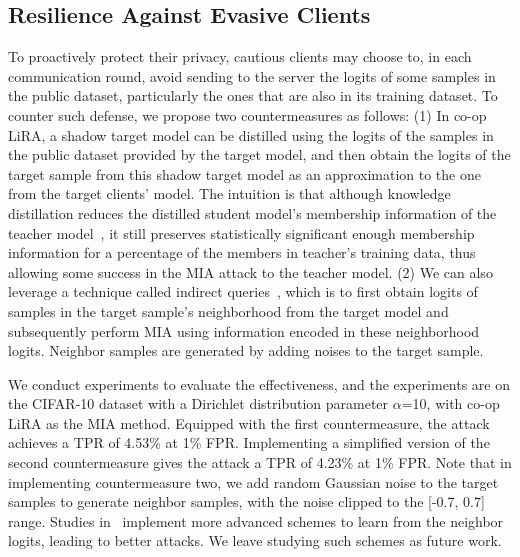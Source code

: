 \subsection{Resilience Against Evasive Clients}
To proactively protect their privacy,  cautious clients may choose to, in each communication round, avoid sending to the server the logits of some samples in the public dataset, particularly the ones that are also in its training dataset. 
To counter such defense, we propose two countermeasures as follows:
(1) In co-op LiRA, a shadow target model can be distilled using the logits of the samples in the public dataset provided by the target model, and then obtain the logits of the target sample from this shadow target model as an approximation to the one from the target clients' model. 
The intuition is that although knowledge distillation reduces the distilled student model's membership information of the teacher model~\cite{jagielski2024students}, it still preserves statistically significant enough membership information for a percentage of the members in teacher's training data, thus allowing some success in the MIA attack to the teacher model.
(2) We can also leverage a technique called indirect queries~\cite{wen2022canary, long2020pragmatic}, which is to first obtain logits of samples in the target sample's neighborhood from the target model and subsequently perform MIA using information encoded in these neighborhood logits. Neighbor samples are generated by adding noises to the target sample.

We conduct experiments to evaluate the effectiveness, and the experiments are on the CIFAR-10 dataset with a Dirichlet distribution parameter $\alpha$=10, with co-op LiRA as the MIA method.
Equipped with the first countermeasure, the attack achieves a TPR of 4.53\% at 1\% FPR.
Implementing a simplified version of the second countermeasure gives the attack a TPR of 4.23\% at 1\% FPR.
Note that in implementing countermeasure two, we add random Gaussian noise to the target samples to generate neighbor samples, with the noise clipped to the [-0.7, 0.7] range.
Studies in~\cite{wen2022canary, long2020pragmatic} implement more advanced schemes to learn from the neighbor logits, leading to better attacks. We leave studying such schemes as future work.
